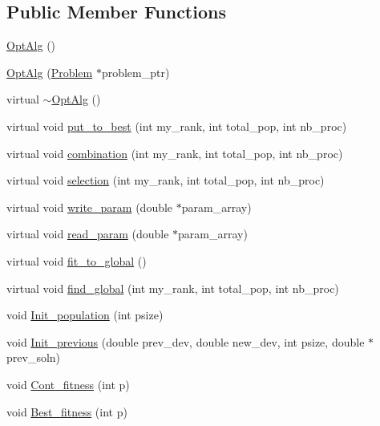 \subsection*{Public Member Functions}
\begin{DoxyCompactItemize}
\item 
\hyperlink{class_opt_alg_a43c2ab2d0561c3de89d1ecc65a81be23}{Opt\+Alg} ()
\item 
\hyperlink{class_opt_alg_abe77a22ec86aaf801f2050de5bdca121}{Opt\+Alg} (\hyperlink{class_problem}{Problem} $\ast$problem\+\_\+ptr)
\item 
virtual \hyperlink{class_opt_alg_a1a22782269d040e5d946c6eda2513929}{$\sim$\+Opt\+Alg} ()
\item 
virtual void \hyperlink{class_opt_alg_ac7569e761ec41dcbdad32af72f6a367c}{put\+\_\+to\+\_\+best} (int my\+\_\+rank, int total\+\_\+pop, int nb\+\_\+proc)
\item 
virtual void \hyperlink{class_opt_alg_aa559fe662bf710dcb59fdbdad37d7166}{combination} (int my\+\_\+rank, int total\+\_\+pop, int nb\+\_\+proc)
\item 
virtual void \hyperlink{class_opt_alg_a3badd6d65bfd2b578974fad574c54ce0}{selection} (int my\+\_\+rank, int total\+\_\+pop, int nb\+\_\+proc)
\item 
virtual void \hyperlink{class_opt_alg_a30d9983af0d0eb8125e888e87fd37a99}{write\+\_\+param} (double $\ast$param\+\_\+array)
\item 
virtual void \hyperlink{class_opt_alg_a7c1def4dcd71ac4a9f9b7edf06503557}{read\+\_\+param} (double $\ast$param\+\_\+array)
\item 
virtual void \hyperlink{class_opt_alg_af9dd802bb54ddda92d1284ae1f9e03f8}{fit\+\_\+to\+\_\+global} ()
\item 
virtual void \hyperlink{class_opt_alg_a5e29a74018889b754985e6e30cf0cd8a}{find\+\_\+global} (int my\+\_\+rank, int total\+\_\+pop, int nb\+\_\+proc)
\item 
void \hyperlink{class_opt_alg_aa41bb2ae61dade0b4a77ce73676b1e9e}{Init\+\_\+population} (int psize)
\item 
void \hyperlink{class_opt_alg_a492a3ed39231569801db4cf8f271da9f}{Init\+\_\+previous} (double prev\+\_\+dev, double new\+\_\+dev, int psize, double $\ast$prev\+\_\+soln)
\item 
void \hyperlink{class_opt_alg_a777e1aa4c2eff276b03b1e68e0ae575e}{Cont\+\_\+fitness} (int p)
\item 
void \hyperlink{class_opt_alg_a1bfdb110e81c3ecb852661df45abcaa8}{Best\+\_\+fitness} (int p)
\item 

\end{DoxyCompactItemize}
